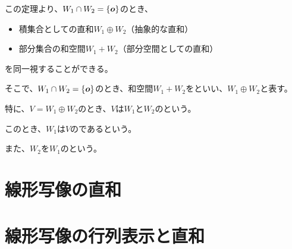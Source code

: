 \documentclass[../../../topic_linear-algebra]{subfiles}
\begin{document}
この定理より、$W_1 \cap W_2 = \{ \vb*{o} \}$のとき、
\begin{itemize}
  \item 積集合としての直和$W_1 \oplus W_2$（抽象的な直和）
  \item 部分集合の和空間$W_1 + W_2$（部分空間としての直和）
\end{itemize}
を同一視することができる。

\br

そこで、$W_1 \cap W_2 = \{ \vb*{o} \}$のとき、和空間$W_1 + W_2$をといい、$W_1 \oplus W_2$と表す。

\br

特に、$V = W_1 \oplus W_2$のとき、$V$は$W_1$と$W_2$のという。

このとき、$W_1$は$V$のであるという。

また、$W_2$を$W_1$のという。

\begin{mindflow}
\end{mindflow}

\sectionline
\section{線形写像の直和}

\begin{mindflow}
  \todo{}
\end{mindflow}

\sectionline
\section{線形写像の行列表示と直和}

\begin{mindflow}
  \todo{}
\end{mindflow}
\end{document}
